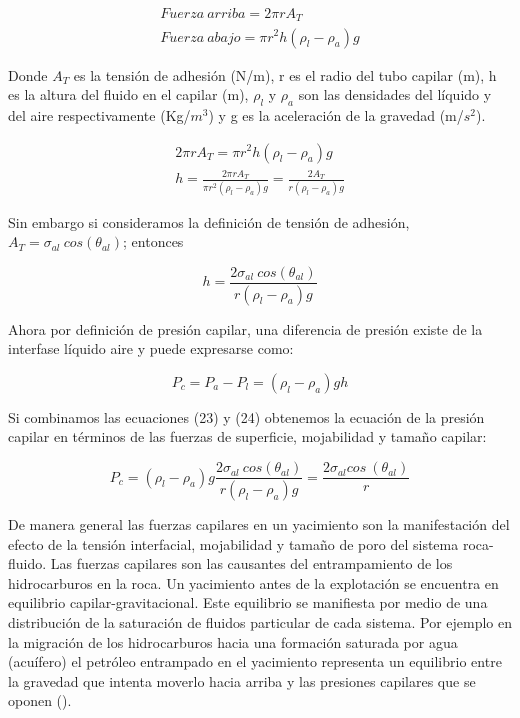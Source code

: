 \begin{gather}
Fuerza~arriba=2\pi rA_{T} \\[10pt]
Fuerza~abajo=\pi r^{2} h (\rho_{l}-\rho_{a}) g
\end{gather}

Donde $A_{T}$ es la tensión de adhesión (N/m), r es el radio del tubo capilar (m), h es la altura del fluido en el capilar (m), $\rho_{l}$ y $\rho_{a}$ son las densidades del líquido y del aire respectivamente (Kg/$m^{3}$) y g es la aceleración de la gravedad (m/$s^{2}$).

\begin{gather}
2\pi r A_{T} = \pi r^{2} h (\rho_{l}-\rho_{a}) g \\[10pt]
h= \frac{2\pi r A_{T}}{\pi r^{2}(\rho_{l}-\rho_{a}) g}=\frac{2 A_{T}}{r (\rho_{l}-\rho_{a}) g}
\end{gather}

Sin embargo si consideramos la definición de tensión de adhesión, $A_{T} = \sigma_{al}~cos(\theta_{al})$; entonces

\begin{equation}
h=\frac{2 \sigma_{al}~cos(\theta_{al})}{r(\rho_{l}-\rho_{a})g}
\end{equation}

Ahora por definición de presión capilar, una diferencia de presión existe de la interfase líquido aire y puede expresarse como:

\begin{equation}
P_{c}=P_{a}-P_{l}=(\rho_{l}-\rho_{a})gh
\end{equation}

Si combinamos las ecuaciones (23) y (24) obtenemos la ecuación de la presión capilar en términos de las fuerzas de superficie, mojabilidad y tamaño capilar:

\begin{equation}
P_{c} = (\rho_{l}-\rho_{a}) g \frac{2 \sigma_{al}~cos(\theta_{al})}{r(\rho_{l}-\rho_{a}) g} = \frac{2 \sigma_{al} cos~(\theta_{al})}{r}
\end{equation}

De manera general las fuerzas capilares en un yacimiento son la manifestación del efecto de la tensión interfacial, mojabilidad y tamaño de poro del sistema roca-fluido. Las fuerzas capilares son las causantes del entrampamiento de los hidrocarburos en la roca. Un yacimiento antes de la explotación se encuentra en equilibrio capilar-gravitacional. Este equilibrio se manifiesta por medio de una distribución de la saturación de fluidos particular de cada sistema. Por ejemplo en la migración de los hidrocarburos hacia una formación saturada por agua (acuífero) el petróleo entrampado en el yacimiento representa un equilibrio entre la gravedad que intenta moverlo hacia arriba y las presiones capilares que se oponen (\cite{Leverett}). 

